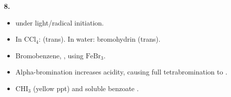 \documentclass[10pt,a4paper]{article}
\begin{document}
\textbf{8.}
\begin{itemize}
     \item[a.]  under light/radical initiation.
     \item[b.] In $\text{CCl}_4$:  (trans). In water: bromohydrin (trans).
     \item[c.] Bromobenzene, , using $\text{FeBr}_3$.
     \item[d.] Alpha-bromination increases acidity, causing full tetrabromination to .
     \item[e.] $\text{CHI}_3$ (yellow ppt) and soluble benzoate .
\end{itemize}
\end{document}
